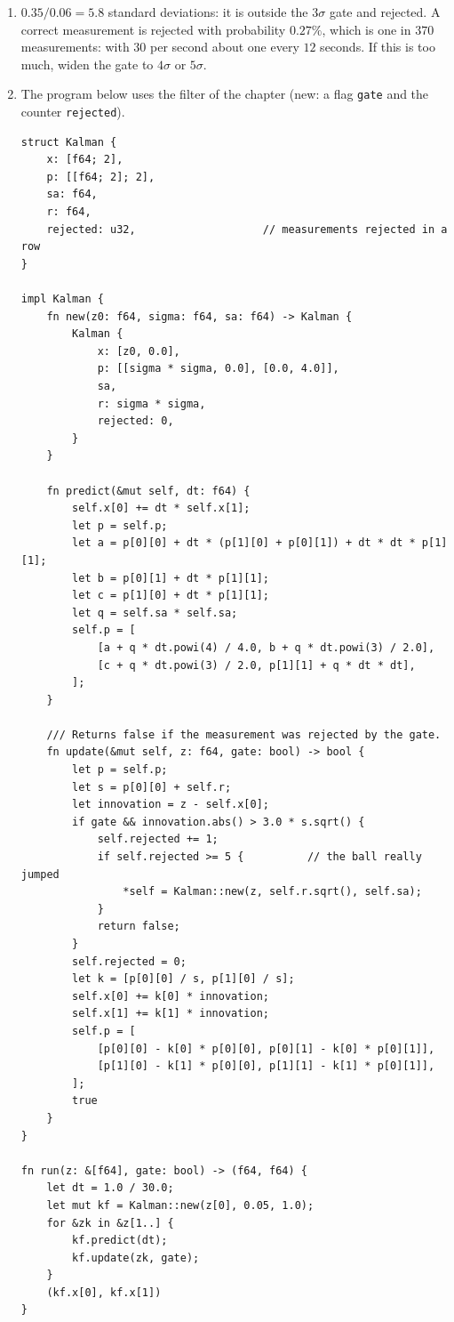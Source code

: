 \begin{enumerate}[label=\textbf{\ansnum.\arabic*}]
  \item $0.35/0.06=5.8$ standard deviations: it is outside the $3\sigma$ gate and rejected. A correct measurement is rejected with probability $0.27\%$, which is one in $370$ measurements: with $30$ per second about one every $12$ seconds. If this is too much, widen the gate to $4\sigma$ or $5\sigma$.
  \item The program below uses the filter of the chapter (new: a flag \verb!gate! and the counter \verb!rejected!).
\begin{verbatim}
struct Kalman {
    x: [f64; 2],
    p: [[f64; 2]; 2],
    sa: f64,
    r: f64,
    rejected: u32,                    // measurements rejected in a row
}

impl Kalman {
    fn new(z0: f64, sigma: f64, sa: f64) -> Kalman {
        Kalman {
            x: [z0, 0.0],
            p: [[sigma * sigma, 0.0], [0.0, 4.0]],
            sa,
            r: sigma * sigma,
            rejected: 0,
        }
    }

    fn predict(&mut self, dt: f64) {
        self.x[0] += dt * self.x[1];
        let p = self.p;
        let a = p[0][0] + dt * (p[1][0] + p[0][1]) + dt * dt * p[1][1];
        let b = p[0][1] + dt * p[1][1];
        let c = p[1][0] + dt * p[1][1];
        let q = self.sa * self.sa;
        self.p = [
            [a + q * dt.powi(4) / 4.0, b + q * dt.powi(3) / 2.0],
            [c + q * dt.powi(3) / 2.0, p[1][1] + q * dt * dt],
        ];
    }

    /// Returns false if the measurement was rejected by the gate.
    fn update(&mut self, z: f64, gate: bool) -> bool {
        let p = self.p;
        let s = p[0][0] + self.r;
        let innovation = z - self.x[0];
        if gate && innovation.abs() > 3.0 * s.sqrt() {
            self.rejected += 1;
            if self.rejected >= 5 {          // the ball really jumped
                *self = Kalman::new(z, self.r.sqrt(), self.sa);
            }
            return false;
        }
        self.rejected = 0;
        let k = [p[0][0] / s, p[1][0] / s];
        self.x[0] += k[0] * innovation;
        self.x[1] += k[1] * innovation;
        self.p = [
            [p[0][0] - k[0] * p[0][0], p[0][1] - k[0] * p[0][1]],
            [p[1][0] - k[1] * p[0][0], p[1][1] - k[1] * p[0][1]],
        ];
        true
    }
}

fn run(z: &[f64], gate: bool) -> (f64, f64) {
    let dt = 1.0 / 30.0;
    let mut kf = Kalman::new(z[0], 0.05, 1.0);
    for &zk in &z[1..] {
        kf.predict(dt);
        kf.update(zk, gate);
    }
    (kf.x[0], kf.x[1])
}


\end{verbatim}
\end{enumerate}
